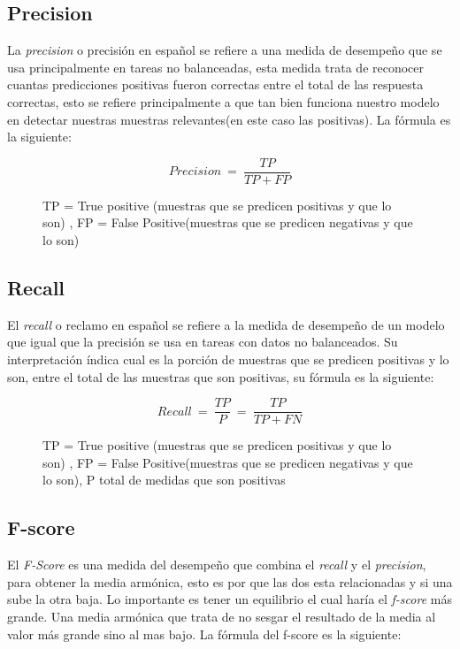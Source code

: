\subsection{Precision}

\par La \textit{precision} o precisión en español se refiere a una medida de desempeño que se usa principalmente en tareas no balanceadas, esta medida trata de reconocer cuantas predicciones positivas fueron correctas entre el total de las respuesta correctas, esto se refiere principalmente a que tan bien funciona nuestro modelo en detectar nuestras muestras relevantes(en este caso las positivas). La fórmula es la siguiente:
\begin{figure}[H]
	\centering
	\begin{equation*}
		Precision\ =\ \frac{TP}{TP+FP}
	\end{equation*}
	\caption*{TP = True positive (muestras que se predicen positivas y que lo son) , FP = False Positive(muestras que se predicen negativas y que lo son)}
\end{figure}


\subsection{Recall}

\par El \textit{recall} o reclamo en español se refiere a la medida de desempeño de un modelo que igual que la precisión se usa en tareas con datos no balanceados. Su interpretación índica cual es la porción de muestras que se predicen positivas y lo son, entre el total de las muestras que son positivas, su fórmula es la siguiente:

\begin{figure}[H]
	\centering
	\begin{equation*}
		Recall\ =\ \frac{TP}{P}\ =\ \frac{TP}{TP+FN}
	\end{equation*}
	\caption*{TP = True positive (muestras que se predicen positivas y que lo son) , FP = False Positive(muestras que se predicen negativas y que lo son), P total de medidas que son positivas}
\end{figure}

\subsection{F-score}

\par El \textit{F-Score} es una medida del desempeño que combina el \textit{recall} y el \textit{precision}, para obtener la media armónica, esto es por que las dos esta relacionadas y si una sube la otra baja. Lo importante es tener un equilibrio el cual haría el \textit{f-score} más grande. Una media armónica que trata de no sesgar el resultado de la media al valor más grande sino al mas bajo. La fórmula del f-score es la siguiente:

